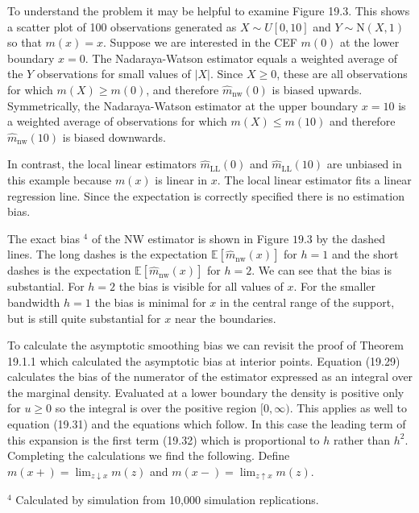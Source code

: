 \documentclass[10pt]{article}
\begin{document}
To understand the problem it may be helpful to examine Figure 19.3. This shows a scatter plot of 100 observations generated as $X \sim U[0,10]$ and $Y \sim \mathrm{N}(X, 1)$ so that $m(x)=x$. Suppose we are interested in the CEF $m(0)$ at the lower boundary $x=0$. The Nadaraya-Watson estimator equals a weighted average of the $Y$ observations for small values of $|X|$. Since $X \geq 0$, these are all observations for which $m(X) \geq m(0)$, and therefore $\hat{m}_{\mathrm{nw}}(0)$ is biased upwards. Symmetrically, the Nadaraya-Watson estimator at the upper boundary $x=10$ is a weighted average of observations for which $m(X) \leq m(10)$ and therefore $\widehat{m}_{\mathrm{nw}}(10)$ is biased downwards.

In contrast, the local linear estimators $\widehat{m}_{\mathrm{LL}}(0)$ and $\widehat{m}_{\mathrm{LL}}(10)$ are unbiased in this example because $m(x)$ is linear in $x$. The local linear estimator fits a linear regression line. Since the expectation is correctly specified there is no estimation bias.

The exact bias ${ }^{4}$ of the NW estimator is shown in Figure $19.3$ by the dashed lines. The long dashes is the expectation $\mathbb{E}\left[\widehat{m}_{\mathrm{nw}}(x)\right]$ for $h=1$ and the short dashes is the expectation $\mathbb{E}\left[\widehat{m}_{\mathrm{nw}}(x)\right]$ for $h=2$. We can see that the bias is substantial. For $h=2$ the bias is visible for all values of $x$. For the smaller bandwidth $h=1$ the bias is minimal for $x$ in the central range of the support, but is still quite substantial for $x$ near the boundaries.

To calculate the asymptotic smoothing bias we can revisit the proof of Theorem 19.1.1 which calculated the asymptotic bias at interior points. Equation (19.29) calculates the bias of the numerator of the estimator expressed as an integral over the marginal density. Evaluated at a lower boundary the density is positive only for $u \geq 0$ so the integral is over the positive region $[0, \infty)$. This applies as well to equation (19.31) and the equations which follow. In this case the leading term of this expansion is the first term (19.32) which is proportional to $h$ rather than $h^{2}$. Completing the calculations we find the following. Define $m(x+)=\lim _{z \downarrow x} m(z)$ and $m(x-)=\lim _{z \uparrow x} m(z)$.

${ }^{4}$ Calculated by simulation from 10,000 simulation replications.
\end{document}
